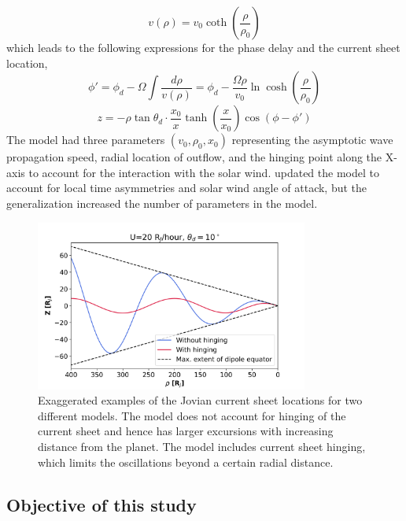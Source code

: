 \begin{equation}
    v(\rho) = v_0 \coth \left(\frac{\rho}{\rho_0} \right)
\end{equation}
which leads to the following expressions for the phase delay and the current sheet location,
\begin{equation}
    \phi' = \phi_d - \Omega \int \frac{d\rho}{v(\rho)} = \phi_d - \frac{\Omega \rho}{v_0} \ln \cosh \left( \frac{\rho}{\rho_0} \right) 
\end{equation}
\begin{equation}
    z = -\rho \tan\theta_d \cdot \frac{x_0}{x} \tanh\left(\frac{x}{x_0} \right) \cos\left( \phi - \phi'\right) 
    \label{eqn:khurana1992}
\end{equation}
The  model had three parameters $(v_0, \rho_0, x_0)$ representing the asymptotic wave propagation speed, radial location of outflow, and the hinging point along the X-axis to account for the interaction with the solar wind.  updated the model to account for local time asymmetries and solar wind angle of attack, but the generalization increased the number of parameters in the model. 

\begin{figure}
    \centering
    \includegraphics[width=0.8\textwidth]{images6/example-hinging.png}
    \caption{Exaggerated examples of the Jovian current sheet locations for two different models. The \protect{} model does not account for hinging of the current sheet and hence has larger excursions with increasing distance from the planet. The \protect{} model includes current sheet hinging, which limits the oscillations beyond a certain radial distance.}
    \label{fig:example-hinging}
\end{figure}

\subsection{Objective of this study}

